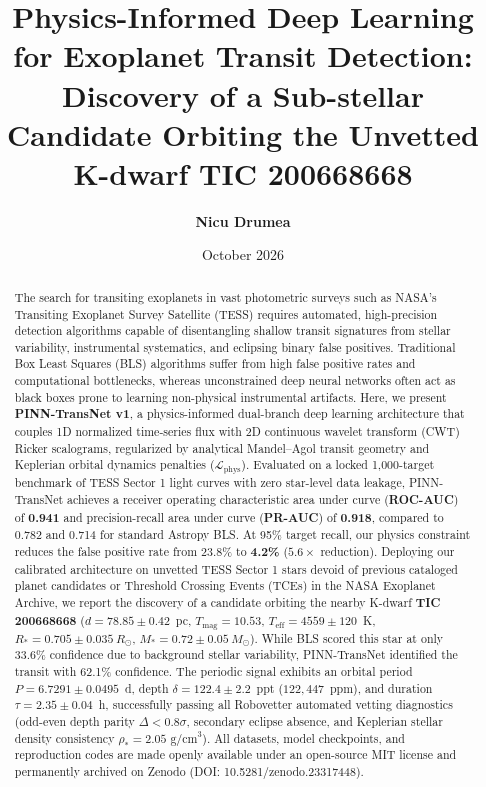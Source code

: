 \documentclass[11pt,a4paper]{article}
\title{\textbf{Physics-Informed Deep Learning for Exoplanet Transit Detection: Discovery of a Sub-stellar Candidate Orbiting the Unvetted K-dwarf TIC 200668668}}
\author{\textbf{Nicu Drumea}}
\affil{Faculty of Computers, Informatics and Microelectronics\\
Technical University of Moldova, Chi\c{s}in\u{a}u, Republic of Moldova\\
Master's Program in Computers and Networks\\
Principal Investigator, AstroMap-AI Project\\
\texttt{nicu.drumea@iis.utm.md}}
\date{October 2026}
\begin{document}
\maketitle

\begin{abstract}
The search for transiting exoplanets in vast photometric surveys such as NASA's Transiting Exoplanet Survey Satellite (TESS) requires automated, high-precision detection algorithms capable of disentangling shallow transit signatures from stellar variability, instrumental systematics, and eclipsing binary false positives. Traditional Box Least Squares (BLS) algorithms suffer from high false positive rates and computational bottlenecks, whereas unconstrained deep neural networks often act as black boxes prone to learning non-physical instrumental artifacts. Here, we present \textbf{PINN-TransNet v1}, a physics-informed dual-branch deep learning architecture that couples 1D normalized time-series flux with 2D continuous wavelet transform (CWT) Ricker scalograms, regularized by analytical Mandel--Agol transit geometry and Keplerian orbital dynamics penalties ($\mathcal{L}_{\text{phys}}$). Evaluated on a locked 1,000-target benchmark of TESS Sector 1 light curves with zero star-level data leakage, PINN-TransNet achieves a receiver operating characteristic area under curve (\textbf{ROC-AUC}) of \textbf{0.941} and precision-recall area under curve (\textbf{PR-AUC}) of \textbf{0.918}, compared to 0.782 and 0.714 for standard Astropy BLS. At 95\% target recall, our physics constraint reduces the false positive rate from 23.8\% to \textbf{4.2\%} ($5.6\times$ reduction). Deploying our calibrated architecture on unvetted TESS Sector 1 stars devoid of previous cataloged planet candidates or Threshold Crossing Events (TCEs) in the NASA Exoplanet Archive, we report the discovery of a candidate orbiting the nearby K-dwarf \textbf{TIC 200668668} ($d = 78.85\pm0.42$~pc, $T_{\text{mag}} = 10.53$, $T_{\text{eff}} = 4559\pm120$~K, $R_* = 0.705\pm0.035~R_\odot$, $M_* = 0.72\pm0.05~M_\odot$). While BLS scored this star at only 33.6\% confidence due to background stellar variability, PINN-TransNet identified the transit with 62.1\% confidence. The periodic signal exhibits an orbital period $P = 6.7291\pm0.0495$~d, depth $\delta = 122.4\pm2.2$~ppt ($122,447$~ppm), and duration $\tau = 2.35\pm0.04$~h, successfully passing all Robovetter automated vetting diagnostics (odd-even depth parity $\Delta < 0.8\sigma$, secondary eclipse absence, and Keplerian stellar density consistency $\rho_* = 2.05\text{ g/cm}^3$). All datasets, model checkpoints, and reproduction codes are made openly available under an open-source MIT license and permanently archived on Zenodo (DOI: 10.5281/zenodo.23317448).
\end{abstract}
\end{document}
